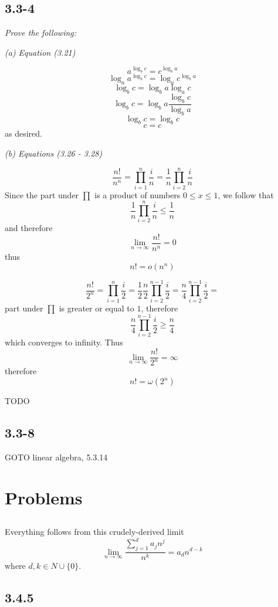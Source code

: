\documentclass[11pt,oneside,titlepage]{book}
\begin{document}
\subsection*{3.3-4}

\textit{Prove the following: }

\textit{(a) Equation (3.21)}

$$a^{\log_b{c}} = c^{\log_b{a}}$$
$$\log_a{a^{\log_b{c}}} = \log_a{c^{\log_b{a}}}$$
$$\log_b{c} = \log_b{a} \log_a{c}$$
$$\log_b{c} = \log_b{a} \frac{\log_b{c}}{\log_b{a}}$$
$$\log_b{c} = \log_b{c}$$
$$c = c$$
as desired.

\textit{(b) Equations (3.26 - 3.28)}


$$\frac{n!}{n^n} = \prod_{i = 1}^n{\frac{i}{n}} = \frac{1}{n} \prod_{i = 2}^n{\frac{i}{n}}$$
Since the part under $\prod$ is a product of numbers $0 \leq x \leq 1$, we follow that
$$\frac{1}{n} \prod_{i = 2}^n{\frac{i}{n}} \leq \frac{1}{n}$$
and therefore 
$$\lim_{n \to \infty}{\frac{n!}{n^n}} = 0$$
thus
$$n! = o(n^n)$$

$$\frac{n!}{2^n} = \prod_{i = 1}^{n}{\frac{i}{2}} =
\frac{1}{2} \frac{n}{2} \prod_{i = 2}^{n - 1}{\frac{i}{2}} =
\frac{n}{4} \prod_{i = 2}^{n - 1}{\frac{i}{2}} = 
$$
part under $\prod$ is greater or equal to $1$, therefore
$$\frac{n}{4} \prod_{i = 2}^{n - 1}{\frac{i}{2}} \geq \frac{n}{4}$$
which converges to infinity. Thus
$$\lim_{n \to \infty}{\frac{n!}{2^n}} = \infty$$
therefore
$$n! = \omega(2^n)$$

TODO


\subsection*{3.3-8}

GOTO linear algebra, 5.3.14

\section{Problems}

\subsection{}

Everything follows from this crudely-derived limit
$$\lim_{n \to \infty}{\frac{\sum_{j = 1}^d {a_j n^j}}{n^k}} = a_d n^{d - k} $$
where $d, k \in N \cup \{0\}$.

\subsection*{3.4.5}
\end{document}
